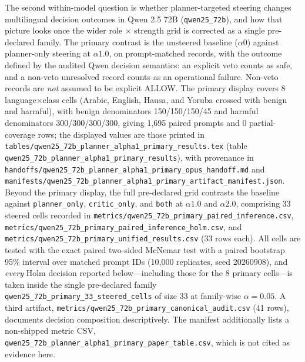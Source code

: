 The second within-model question is whether planner-targeted steering changes
multilingual decision outcomes in Qwen 2.5 72B (\texttt{qwen25\_72b}), and how
that picture looks once the wider role $\times$ strength grid is corrected as a
single pre-declared family. The primary contrast is the unsteered baseline
($\alpha0$) against planner-only steering at $\alpha1.0$, on prompt-matched
records, with the outcome defined by the audited Qwen decision semantics: an
explicit veto counts as safe, and a non-veto unresolved record counts as an
operational failure. Non-veto records are \emph{not} assumed to be explicit
ALLOW. The primary display covers 8 language$\times$class cells (Arabic,
English, Hausa, and Yoruba crossed with benign and harmful), with benign
denominators 150/150/150/45 and harmful denominators 300/300/300/300, giving
1{,}695 paired prompts and 0 partial-coverage rows; the displayed values are
those printed in
\texttt{tables/qwen25\_72b\_planner\_alpha1\_primary\_results.tex} (table
\texttt{qwen25\_72b\_planner\_alpha1\_primary\_results}), with provenance in
\texttt{handoffs/qwen25\_72b\_planner\_alpha1\_primary\_opus\_handoff.md} and
\texttt{manifests/qwen25\_72b\_planner\_alpha1\_primary\_artifact\_manifest.json}.
Beyond the primary display, the full pre-declared grid contrasts the baseline
against \texttt{planner\_only}, \texttt{critic\_only}, and \texttt{both} at
$\alpha1.0$ and $\alpha2.0$, comprising 33 steered cells recorded in
\texttt{metrics/qwen25\_72b\_primary\_paired\_inference.csv},
\texttt{metrics/qwen25\_72b\_primary\_paired\_inference\_holm.csv}, and
\texttt{metrics/qwen25\_72b\_primary\_unified\_results.csv} (33 rows each). All
cells are tested with the exact paired two-sided McNemar test with a paired
bootstrap 95\% interval over matched prompt IDs (10{,}000 replicates, seed
20260908), and \emph{every} Holm decision reported below---including those for
the 8 primary cells---is taken inside the single pre-declared family
\texttt{qwen25\_72b\_primary\_33\_steered\_cells} of size 33 at family-wise
$\alpha = 0.05$. A third artifact,
\texttt{metrics/qwen25\_72b\_primary\_canonical\_audit.csv} (41 rows), documents
decision composition descriptively. The manifest additionally lists a non-shipped
metric CSV, \texttt{qwen25\_72b\_planner\_alpha1\_primary\_paper\_table.csv},
which is not cited as evidence here.


